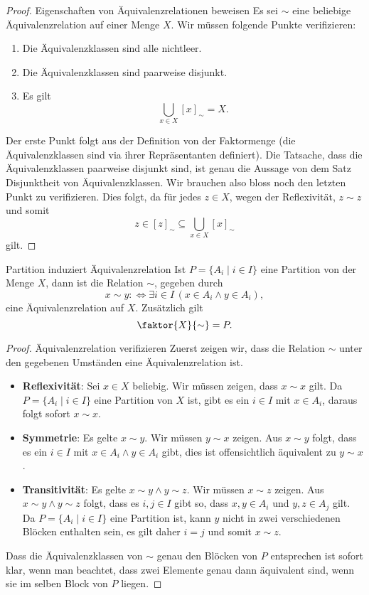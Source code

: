    \begin{proof}{Eigenschaften von Äquivalenzrelationen beweisen}
    Es sei $\sim$ eine beliebige Äquivalenzrelation auf einer Menge $X$. Wir müssen folgende Punkte verifizieren:
    \begin{enumerate}
    \item\label{a} Die Äquivalenzklassen sind alle nichtleer.
    \item\label{2} Die Äquivalenzklassen sind paarweise disjunkt.
    \item\label{3} Es gilt
    \[
    \bigcup_{x\in X}[x]_{\sim}=X.
    \]
    \end{enumerate}
    Der erste Punkt folgt aus der Definition von der Faktormenge (die Äquivalenzklassen sind via ihrer Repräsentanten definiert). Die Tatsache, dass die Äquivalenzklassen paarweise disjunkt sind, ist genau die Aussage von dem Satz Disjunktheit von Äquivalenzklassen. Wir brauchen also bloss noch den letzten Punkt zu verifizieren. Dies folgt, da für jedes $z\in X$, wegen der Reflexivität, $z\sim z$ und somit
    \[
    z\in[z]_\sim\subseteq\bigcup_{x\in X}[x]_\sim
    \]
    gilt.
    \end{proof}



    \begin{lemma}{Partition induziert Äquivalenzrelation}
    Ist $P=\{A_i\mid i\in I\}$ eine Partition von der Menge $X$, dann ist die Relation $\sim$, gegeben durch
    \[
    x\sim y:\Leftrightarrow \exists i\in I\,(x\in A_i\land y\in A_i),
    \]
    eine Äquivalenzrelation auf $X$. Zusätzlich gilt
    \[
    \faktor{X}{\sim}=P.
    \]
    \end{lemma}
    
    \begin{proof}{Äquivalenzrelation verifizieren}
    Zuerst zeigen wir, dass die Relation $\sim$ unter den gegebenen Umständen eine Äquivalenzrelation ist.
    \begin{itemize}
    \item \textbf{Reflexivität}: Sei $x\in X$  beliebig. Wir müssen zeigen, dass $x\sim x$ gilt. Da $P=\{A_i\mid i\in I\}$ eine Partition von $X$ ist, gibt es ein $i\in I$ mit $x\in A_i$, daraus folgt sofort $x\sim x$.
    \item \textbf{Symmetrie}: Es gelte $x\sim y$. Wir müssen $y\sim x$ zeigen. Aus $x\sim y$ folgt, dass es ein $i\in I$ mit $x\in A_i\land y\in A_i$ gibt, dies ist offensichtlich äquivalent zu $y\sim x$.
    \item \textbf{Transitivität}: Es gelte $x\sim y\land y\sim z$. Wir müssen $x\sim z$ zeigen. Aus $x\sim y\land y\sim z$ folgt, dass es $i,j\in I$ gibt so, dass $x,y\in A_i$ und $y,z\in A_j$ gilt. Da $P=\{A_i\mid i\in I\}$ eine Partition ist, kann $y $ nicht in zwei verschiedenen Blöcken enthalten sein, es gilt daher $i=j$ und somit $x\sim z$.
    \end{itemize}
    Dass die Äquivalenzklassen von $\sim$ genau den Blöcken von $P$ entsprechen ist sofort klar, wenn man beachtet, dass zwei Elemente genau dann äquivalent sind, wenn sie im selben Block von $P$ liegen.
    \end{proof}

